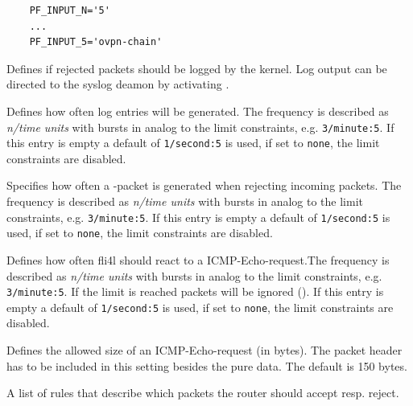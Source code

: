 \begin{description}
\begin{example}
\begin{verbatim}
    PF_INPUT_N='5'
    ...
    PF_INPUT_5='ovpn-chain'
\end{verbatim}
\end{example}

Defines if rejected packets should be logged by the kernel.
Log output can be directed to the syslog deamon by activating .

Defines how often log entries will be generated. The frequency is described
as \emph{n/time units} with bursts in analog to the limit constraints, e.g.
\texttt{3/minute:5}. If this entry is empty a default of \texttt{1/second:5}
is used, if set to \texttt{none}, the limit constraints are disabled.

Specifies how often a -packet is generated when rejecting
incoming packets. The frequency is described as \emph{n/time units} with bursts 
in analog to the limit constraints, e.g. \texttt{3/minute:5}. If this entry is
empty a default of \texttt{1/second:5} is used, if set to \texttt{none},
the limit constraints are disabled.

Defines how often fli4l should react to a ICMP-Echo-request.The frequency is
described as \emph{n/time units} with bursts in analog to the limit constraints,
e.g. \texttt{3/minute:5}. If the limit is reached packets will be ignored
(). If this entry is empty a default of \texttt{1/second:5}
is used, if set to \texttt{none}, the limit constraints are disabled.

Defines the allowed size of an ICMP-Echo-request (in bytes). The packet header
has to be included in this setting besides the pure data. The default is 150 bytes.

A list of rules that describe which packets the router should accept resp. reject.
\end{description}

